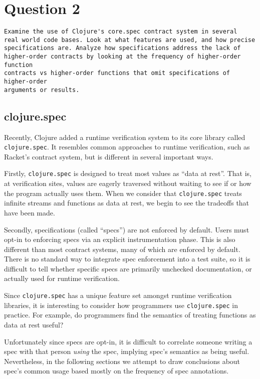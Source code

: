 \section{Question 2}

\begin{verbatim}
Examine the use of Clojure's core.spec contract system in several
real world code bases. Look at what features are used, and how precise
specifications are. Analyze how specifications address the lack of
higher-order contracts by looking at the frequency of higher-order function
contracts vs higher-order functions that omit specifications of higher-order
arguments or results.
\end{verbatim}

\subsection{clojure.spec}

Recently, Clojure added a runtime verification system to its core library called
\texttt{clojure.spec}.
It resembles common approaches to runtime verification, such as Racket's contract
system, but is different in several important ways.

Firstly, \texttt{clojure.spec} is designed to treat most values as ``data at rest''. That is,
at verification sites, values are eagerly traversed without waiting to see
if or how the program actually uses them.
When we consider that \texttt{clojure.spec} treats infinite streams
and functions as data at rest, we begin to see the tradeoffs that have been
made.

Secondly, specifications (called ``specs'') are not enforced by default. Users must
opt-in to enforcing specs via an explicit instrumentation phase.
This is also different than most contract systems, many of which are enforced
by default. There is no standard way to integrate spec enforcement into a
test suite, so it is difficult to tell whether specific specs are primarily 
unchecked documentation, or actually used for runtime verification.

Since \texttt{clojure.spec} has a unique feature set amongst runtime verification
libraries, it is interesting to consider how programmers use \texttt{clojure.spec}
in practice. For example, do programmers find the semantics of treating functions
as data at rest useful?

Unfortunately since specs are opt-in, it is difficult to
correlate someone writing a spec with that person \emph{using} the spec,
implying spec's semantics as being useful.
Nevertheless, in the following sections we attempt to draw conclusions about
spec's common usage based mostly on the frequency of spec annotations.


